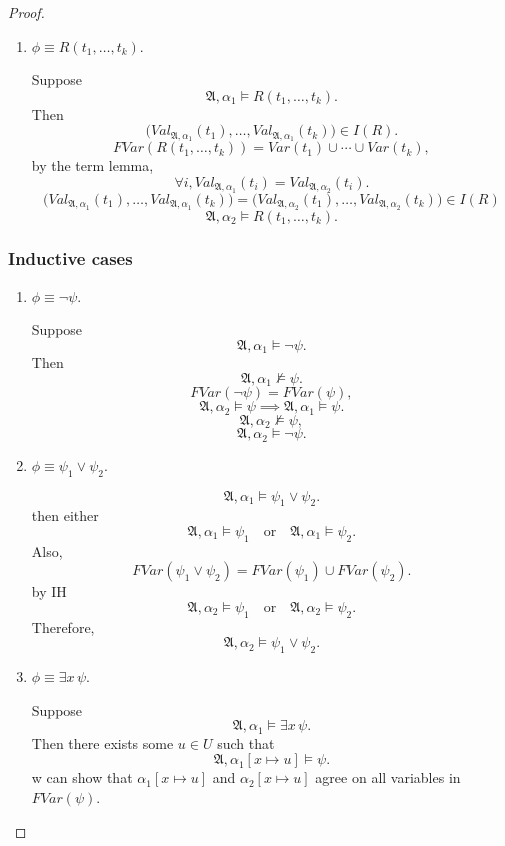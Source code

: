 \documentclass{article}
\begin{document}
\begin{proof}
\begin{enumerate}
    \item $\phi \equiv R(t_1,\dots,t_k)$.

    Suppose
    \[
    \mathfrak{A},\alpha_1 \models R(t_1,\dots,t_k).
    \]
    Then
    \[
    \bigl(Val_{\mathfrak{A},\alpha_1}(t_1),\dots,Val_{\mathfrak{A},\alpha_1}(t_k)\bigr)\in I(R).
    \]
    \[
    FVar(R(t_1,\dots,t_k))=Var(t_1)\cup \cdots \cup Var(t_k),
    \]
    by the term lemma, 
    \[
    \forall i, Val_{\mathfrak{A},\alpha_1}(t_i)=Val_{\mathfrak{A},\alpha_2}(t_i).
    \]
    \[
    \bigl(Val_{\mathfrak{A},\alpha_1}(t_1),\dots,Val_{\mathfrak{A},\alpha_1}(t_k)\bigr) = \bigl(Val_{\mathfrak{A},\alpha_2}(t_1),\dots,Val_{\mathfrak{A},\alpha_2}(t_k)\bigr) \in I(R)
    \]
    \[
    \mathfrak{A},\alpha_2 \models R(t_1,\dots,t_k).
    \]
\end{enumerate}

\subsubsection*{Inductive cases}

\begin{enumerate}
    \item $\phi \equiv \neg \psi$.

    Suppose
    \[
    \mathfrak{A},\alpha_1 \models \neg \psi.
    \]
    Then
    \[
    \mathfrak{A},\alpha_1 \not\models \psi.
    \]
    \[
    FVar(\neg\psi)=FVar(\psi),
    \]
    \[
    \mathfrak{A},\alpha_2 \models \psi \implies \mathfrak{A},\alpha_1 \models \psi.
    \]
    \[
    \mathfrak{A},\alpha_2 \not\models \psi,
    \]
    \[
    \mathfrak{A},\alpha_2 \models \neg \psi.
    \]

    \item $\phi \equiv \psi_1 \lor \psi_2$.

    \[
    \mathfrak{A},\alpha_1 \models \psi_1 \lor \psi_2.
    \]
    then either
    \[
    \mathfrak{A},\alpha_1 \models \psi_1
    \quad\text{or}\quad
    \mathfrak{A},\alpha_1 \models \psi_2.
    \]
    Also,
    \[
    FVar(\psi_1\lor\psi_2)=FVar(\psi_1)\cup FVar(\psi_2).
    \]
    by IH
    \[
    \mathfrak{A},\alpha_2 \models \psi_1
    \quad\text{or}\quad
    \mathfrak{A},\alpha_2 \models \psi_2.
    \]
    Therefore,
    \[
    \mathfrak{A},\alpha_2 \models \psi_1 \lor \psi_2.
    \]

    \item $\phi \equiv \exists x\,\psi$.

    Suppose
    \[
    \mathfrak{A},\alpha_1 \models \exists x\,\psi.
    \]
    Then there exists some $u\in U$ such that
    \[
    \mathfrak{A},\alpha_1[x\mapsto u]\models \psi.
    \]
    w can show that $\alpha_1[x\mapsto u]$ and $\alpha_2[x\mapsto u]$ agree on all variables in $FVar(\psi)$.


\end{enumerate}
\end{proof}
\end{document}

